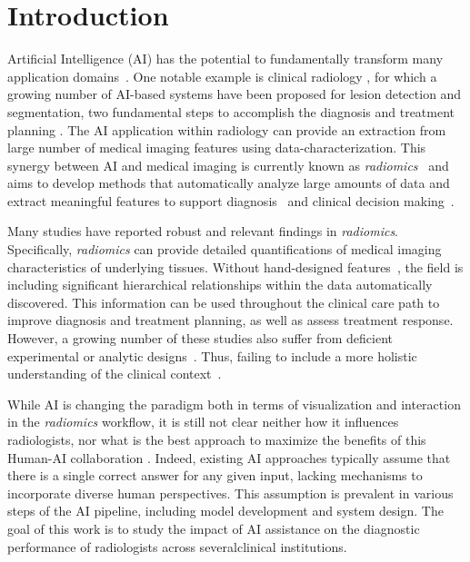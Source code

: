 \section{Introduction}
\label{sec:introduction}

Artificial Intelligence (AI) has the potential to fundamentally transform many application domains~\cite{ghahramani2015probabilistic}.
One notable example is clinical radiology \cite{choy2018current, hosny2018artificial}, for which a growing number of AI-based systems have been proposed for lesion detection and segmentation, two fundamental steps to accomplish the diagnosis and treatment planning \cite{graffy2019automated, kooi2017large, lakhani2017deep, liang2019deep}.
The AI application within radiology can provide an extraction from large number of medical imaging features using data-characterization.
This synergy between AI and medical imaging is currently known as {\it radiomics}~\cite{lambin2012radiomics} and aims to develop methods that automatically analyze large amounts of data and extract meaningful features to support diagnosis~\cite{Ruddle:2016:DEI:2872314.2834117} and clinical decision making~\cite{Park:2015:TOA:2737795.2656213}.

Many studies have reported robust and relevant findings \cite{aerts2017data} in {\it radiomics}.
Specifically, {\it radiomics} can provide detailed quantifications of medical imaging characteristics of underlying tissues.
Without hand-designed features~\cite{ker2018deep}, the field is including significant hierarchical relationships within the data automatically discovered.
This information can be used throughout the clinical care path to improve diagnosis and treatment planning, as well as assess treatment response.
However, a growing number of these studies also suffer from deficient experimental or analytic designs~\cite{aerts2017data}.
Thus, failing to include a more holistic understanding of the clinical context~\cite{Sultanum:2018:MTP:3173574.3173996}.

While AI is changing the paradigm both in terms of visualization and interaction in the {\it radiomics} workflow, it is still not clear neither how it influences radiologists, nor what is the best approach to maximize the benefits of this Human-AI collaboration \cite{Kocielnik:2019:YAI:3290605.3300641}.
Indeed, existing AI approaches typically assume that there is a single correct answer for any given input, lacking mechanisms to incorporate diverse human perspectives.
This assumption is prevalent in various steps of the AI pipeline, including model development and system design.
The goal of this work is to study the impact of AI assistance on the diagnostic performance of radiologists across several\footnotemark[1] clinical institutions.

